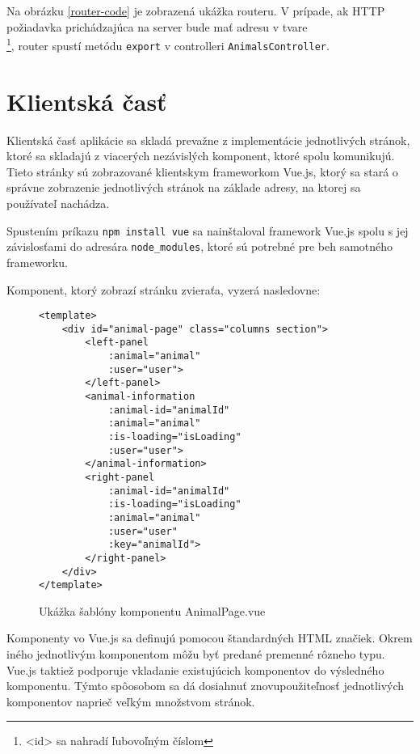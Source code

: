 Na obrázku \ref{router-code} je zobrazená ukážka routeru. V prípade, ak HTTP požiadavka prichádzajúca na server bude mať adresu v tvare\\ \footnote{<id> sa nahradí ľubovoľným číslom}, router spustí metódu \texttt{export} v controlleri \texttt{AnimalsController}.

\section{Klientská časť}
Klientská časť aplikácie sa skladá prevažne z implementácie jednotlivých stránok, ktoré sa skladajú z viacerých nezávislých komponent, ktoré spolu komunikujú. Tieto stránky sú zobrazované klientskym frameworkom Vue.js, ktorý sa stará o správne zobrazenie jednotlivých stránok na základe adresy, na ktorej sa používateľ nachádza.

Spustením príkazu \texttt{npm install vue} sa nainštaloval framework Vue.js spolu s jej závislosťami do adresára \texttt{node_modules}, ktoré sú potrebné pre beh samotného frameworku.

Komponent, ktorý zobrazí stránku zvieraťa, vyzerá nasledovne:

\begin{figure}[H]
\begin{verbatim}
<template>
    <div id="animal-page" class="columns section">
        <left-panel
            :animal="animal"
            :user="user">
        </left-panel>
        <animal-information
            :animal-id="animalId"
            :animal="animal"
            :is-loading="isLoading"
            :user="user">
        </animal-information>
        <right-panel
            :animal-id="animalId"
            :is-loading="isLoading"
            :animal="animal"
            :user="user"
            :key="animalId">
        </right-panel>
    </div>
</template>
\end{verbatim}
\caption[Ukážka šablóny komponentu AnimalPage.vue]
{Ukážka šablóny komponentu AnimalPage.vue}
\label{animal-page-vue-code}
\end{figure}

Komponenty vo Vue.js sa definujú pomocou štandardných HTML značiek. Okrem iného jednotlivým komponentom môžu byť predané premenné rôzneho typu. Vue.js taktiež podporuje vkladanie existujúcich komponentov do výsledného komponentu. Týmto spôosobom sa dá dosiahnuť znovupoužiteľnosť jednotlivých komponentov naprieč veľkým množstvom stránok.

